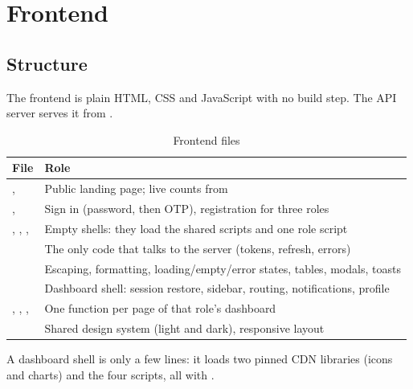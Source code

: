 \chapter{Frontend}\label{ch:frontend}

\section{Structure}

The frontend is plain HTML, CSS and JavaScript with no build step. The API
server serves it from .

\begin{table}[H]
\centering\small
\caption{Frontend files}\label{tab:frontend}
\begin{tabularx}{\textwidth}{@{}P{4cm}Y@{}}
\toprule
\textbf{File} & \textbf{Role} \\
\midrule
{},  & Public landing page; live counts from  \\
,  & Sign in (password, then OTP), registration for three roles \\
, , ,  & Empty shells: they load the shared scripts and one role script \\
 & The only code that talks to the server (tokens, refresh, errors) \\
 & Escaping, formatting, loading/empty/error states, tables, modals, toasts \\
 & Dashboard shell: session restore, sidebar, routing, notifications, profile \\
, , ,  & One function per page of that role's dashboard \\
 & Shared design system (light and dark), responsive layout \\
\bottomrule
\end{tabularx}
\end{table}

A dashboard shell is only a few lines: it loads two pinned CDN libraries
(icons and charts) and the four scripts, all with .

